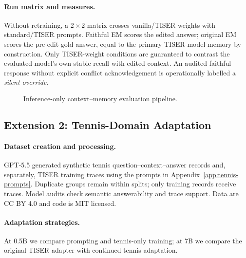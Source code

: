 \documentclass[conference]{IEEEtran}
\begin{document}
\paragraph{Run matrix and measures.}
Without retraining, a $2\times2$ matrix crosses vanilla/TISER weights with standard/TISER prompts. Faithful EM scores the edited answer; original EM scores the pre-edit gold answer, equal to the primary TISER-model memory by construction. Only TISER-weight conditions are guaranteed to contrast the evaluated model's own stable recall with edited context. An audited faithful response without explicit conflict acknowledgement is operationally labelled a \emph{silent override}.

\begin{figure}[t]
\centering
{}
\caption{Inference-only context--memory evaluation pipeline.}
\label{fig:pipeline}
\end{figure}

\subsection{Extension 2: Tennis-Domain Adaptation}

\paragraph{Dataset creation and processing.}
GPT-5.5 generated synthetic tennis question--context--answer records and, separately, TISER training traces using the prompts in Appendix~\ref{app:tennis-prompts}. Duplicate groups remain within splits; only training records receive traces. Model audits check semantic answerability and trace support. Data are CC BY 4.0 and code is MIT licensed.

\paragraph{Adaptation strategies.}
At 0.5B we compare prompting and tennis-only training; at 7B we compare the original TISER adapter with continued tennis adaptation.
\end{document}
